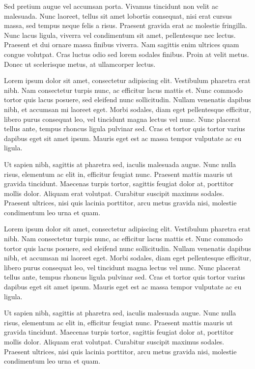 \documentclass[a4paper]{memoir}
\begin{document}
Sed pretium augue vel accumsan porta. Vivamus tincidunt non velit ac malesuada. Nunc laoreet, tellus sit amet lobortis consequat, nisi erat cursus massa, sed tempus neque felis a risus. Praesent gravida erat ac molestie fringilla. Nunc lacus ligula, viverra vel condimentum sit amet, pellentesque nec lectus. Praesent et dui ornare massa finibus viverra. Nam sagittis enim ultrices quam congue volutpat. Cras luctus odio sed lorem sodales finibus. Proin at velit metus. Donec ut scelerisque metus, at ullamcorper lectus. 

Lorem ipsum dolor sit amet, consectetur adipiscing elit. Vestibulum pharetra erat nibh. Nam consectetur turpis nunc, ac efficitur lacus mattis et. Nunc commodo tortor quis lacus posuere, sed eleifend nunc sollicitudin. Nullam venenatis dapibus nibh, et accumsan mi laoreet eget. Morbi sodales, diam eget pellentesque efficitur, libero purus consequat leo, vel tincidunt magna lectus vel nunc. Nunc placerat tellus ante, tempus rhoncus ligula pulvinar sed. Cras et tortor quis tortor varius dapibus eget sit amet ipsum. Mauris eget est ac massa tempor vulputate ac eu ligula. 

Ut sapien nibh, sagittis at pharetra sed, iaculis malesuada augue. Nunc nulla risus, elementum ac elit in, efficitur feugiat nunc. Praesent mattis mauris ut gravida tincidunt. Maecenas turpis tortor, sagittis feugiat dolor at, porttitor mollis dolor. Aliquam erat volutpat. Curabitur suscipit maximus sodales. Praesent ultrices, nisi quis lacinia porttitor, arcu metus gravida nisi, molestie condimentum leo urna et quam. 

Lorem ipsum dolor sit amet, consectetur adipiscing elit. Vestibulum pharetra erat nibh. Nam consectetur turpis nunc, ac efficitur lacus mattis et. Nunc commodo tortor quis lacus posuere, sed eleifend nunc sollicitudin. Nullam venenatis dapibus nibh, et accumsan mi laoreet eget. Morbi sodales, diam eget pellentesque efficitur, libero purus consequat leo, vel tincidunt magna lectus vel nunc. Nunc placerat tellus ante, tempus rhoncus ligula pulvinar sed. Cras et tortor quis tortor varius dapibus eget sit amet ipsum. Mauris eget est ac massa tempor vulputate ac eu ligula. 

Ut sapien nibh, sagittis at pharetra sed, iaculis malesuada augue. Nunc nulla risus, elementum ac elit in, efficitur feugiat nunc. Praesent mattis mauris ut gravida tincidunt. Maecenas turpis tortor, sagittis feugiat dolor at, porttitor mollis dolor. Aliquam erat volutpat. Curabitur suscipit maximus sodales. Praesent ultrices, nisi quis lacinia porttitor, arcu metus gravida nisi, molestie condimentum leo urna et quam. 
\end{document}
